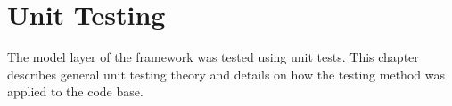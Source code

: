 \chapter{Unit Testing}
The model layer of the framework was tested using unit tests. This chapter describes general unit testing theory and details on how the testing method was applied to the code base.